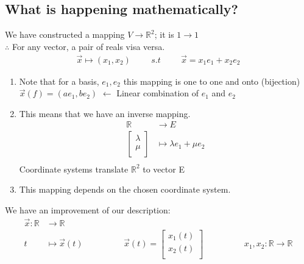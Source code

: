 \documentclass[a4paper,12pt]{article}
\begin{document}
\subsection*{What is happening mathematically?}
We have constructed a mapping $V \rightarrow \mathbb{R}^2$; it is $1 \rightarrow 1$\\
$\therefore$ For any vector, a pair of reals visa versa. 
\begin{align*}
\vec{x} \mapsto (x_1, x_2) \hspace{1cm} s.t \hspace{1cm} \vec{x} = x_1e_1 + x_2e_2
\end{align*}
\begin{enumerate}
	\item Note that for a basis, $e_1, e_2$ this mapping is one to one and onto (bijection) \\
		$\vec{x}(f) = (ae_1, be_2)$ $\leftarrow$ Linear combination of $e_1$ and $e_2$
	\item This means that we have an inverse mapping.
		\begin{align*}
			\mathbb{R} & \rightarrow E \\
			\begin{bmatrix} \lambda \\ \mu \\ \end{bmatrix} & \mapsto \lambda e_1 + \mu e_2 \\
		\end{align*}
		Coordinate systems translate $\mathbb{R}^2$ to vector E
	\item This mapping depends on the chosen coordinate system.
\end{enumerate}
We have an improvement of our description:
\begin{align*}
\vec{x}: \mathbb{R} & \rightarrow \mathbb{R} \\
t & \mapsto \vec{x}(t) \hspace{2cm} \vec{x}(t) = \begin{bmatrix} x_1(t) \\ x_2(t) \\ \end{bmatrix} \hspace{2cm} x_1, x_2: \mathbb{R} \rightarrow \mathbb{R}
\end{align*}
\end{document}
